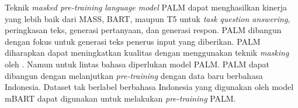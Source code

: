 Teknik \textit{masked pre-training} \textit{language model} \gls{PALM}  dapat menghasilkan kinerja yang lebih baik dari \gls{MASS}, \gls{BART}, maupun T5 untuk \textit{task} \textit{question answering}, peringkasan teks, generasi pertanyaan, dan generasi respon.
\gls{PALM} dibangun dengan fokus untuk generasi teks penerus input yang diberikan.
\gls{PALM} diharapkan dapat meningkatkan kualitas \amrparsing{} dengan menggunakan teknik \textit{masking} oleh \textcite{bai2022}.
Namun untuk \amrparsing{} lintas bahasa diperlukan model \multil{} \gls{PALM}.
\Multil{} \gls{PALM} dapat dibangun dengan melanjutkan \textit{pre-training} dengan data baru berbahasa Indonesia.
Dataset tak berlabel berbahasa Indonesia yang digunakan oleh model mBART  dapat digunakan untuk melakukan \textit{pre-training} \multil{} \gls{PALM}.
